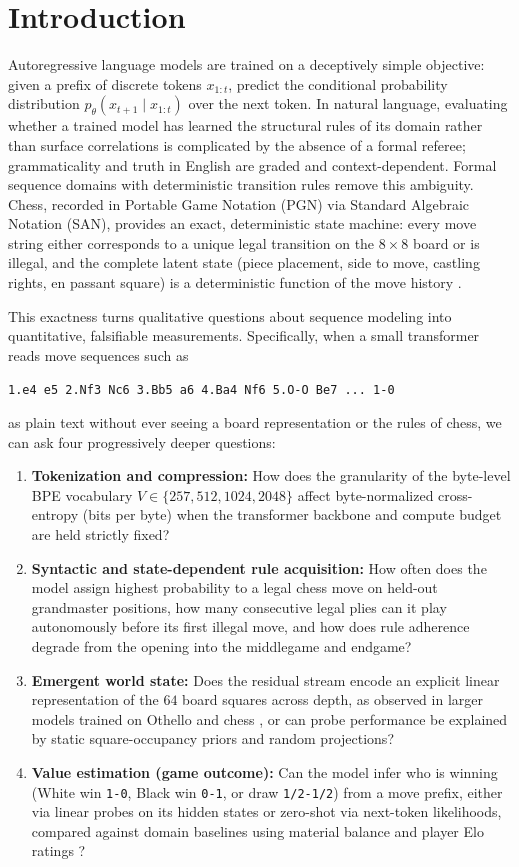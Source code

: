\documentclass[11pt]{article}
\begin{document}
\section{Introduction}
\label{sec:intro}

Autoregressive language models are trained on a deceptively simple objective: given a prefix of discrete tokens $x_{1:t}$, predict the conditional probability distribution $p_\theta(x_{t+1} \mid x_{1:t})$ over the next token. In natural language, evaluating whether a trained model has learned the structural rules of its domain rather than surface correlations is complicated by the absence of a formal referee; grammaticality and truth in English are graded and context-dependent. Formal sequence domains with deterministic transition rules remove this ambiguity. Chess, recorded in Portable Game Notation (PGN) via Standard Algebraic Notation (SAN), provides an exact, deterministic state machine: every move string either corresponds to a unique legal transition on the $8\times 8$ board or is illegal, and the complete latent state (piece placement, side to move, castling rights, en passant square) is a deterministic function of the move history \citep{toshniwal2022chess,karvonen2024chess}.

This exactness turns qualitative questions about sequence modeling into quantitative, falsifiable measurements. Specifically, when a small transformer reads move sequences such as
\begin{center}
\texttt{1.e4 e5 2.Nf3 Nc6 3.Bb5 a6 4.Ba4 Nf6 5.O-O Be7 ... 1-0}
\end{center}
as plain text without ever seeing a board representation or the rules of chess, we can ask four progressively deeper questions:
\begin{enumerate}
\item \textbf{Tokenization and compression:} How does the granularity of the byte-level BPE vocabulary $V \in \{257, 512, 1024, 2048\}$ affect byte-normalized cross-entropy (bits per byte) when the transformer backbone and compute budget are held strictly fixed?
\item \textbf{Syntactic and state-dependent rule acquisition:} How often does the model assign highest probability to a legal chess move on held-out grandmaster positions, how many consecutive legal plies can it play autonomously before its first illegal move, and how does rule adherence degrade from the opening into the middlegame and endgame?
\item \textbf{Emergent world state:} Does the residual stream encode an explicit linear representation of the $64$ board squares across depth, as observed in larger models trained on Othello \citep{li2023othello} and chess \citep{karvonen2024chess}, or can probe performance be explained by static square-occupancy priors and random projections?
\item \textbf{Value estimation (game outcome):} Can the model infer who is winning (White win \texttt{1-0}, Black win \texttt{0-1}, or draw \texttt{1/2-1/2}) from a move prefix, either via linear probes on its hidden states or zero-shot via next-token likelihoods, compared against domain baselines using material balance and player Elo ratings \citep{elo1978}?
\end{enumerate}
\end{document}
